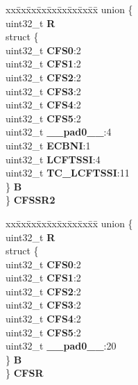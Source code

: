 \begin{DoxyCompactItemize}
\begin{tabbing}
\end{tabbing}\item 
\mbox{\label{structEQADC__tag_a3b79f43167e5031923a7011c88516131}} 
\begin{tabbing}
xx\=xx\=xx\=xx\=xx\=xx\=xx\=xx\=xx\=\kill
union \{\\
\>uint32\_t {\bfseries R}\\
\>struct \{\\
\>\>uint32\_t {\bfseries CFS0}:2\\
\>\>uint32\_t {\bfseries CFS1}:2\\
\>\>uint32\_t {\bfseries CFS2}:2\\
\>\>uint32\_t {\bfseries CFS3}:2\\
\>\>uint32\_t {\bfseries CFS4}:2\\
\>\>uint32\_t {\bfseries CFS5}:2\\
\>\>uint32\_t {\bfseries \_\_pad0\_\_}:4\\
\>\>uint32\_t {\bfseries ECBNI}:1\\
\>\>uint32\_t {\bfseries LCFTSSI}:4\\
\>\>uint32\_t {\bfseries TC\_LCFTSSI}:11\\
\>\} {\bfseries B}\\
\} {\bfseries CFSSR2}\\

\end{tabbing}\item 
\mbox{\label{structEQADC__tag_a1dbfa480c8ddadf34277fa0e7c4dcf3d}} 
\begin{tabbing}
xx\=xx\=xx\=xx\=xx\=xx\=xx\=xx\=xx\=\kill
union \{\\
\>uint32\_t {\bfseries R}\\
\>struct \{\\
\>\>uint32\_t {\bfseries CFS0}:2\\
\>\>uint32\_t {\bfseries CFS1}:2\\
\>\>uint32\_t {\bfseries CFS2}:2\\
\>\>uint32\_t {\bfseries CFS3}:2\\
\>\>uint32\_t {\bfseries CFS4}:2\\
\>\>uint32\_t {\bfseries CFS5}:2\\
\>\>uint32\_t {\bfseries \_\_pad0\_\_}:20\\
\>\} {\bfseries B}\\
\} {\bfseries CFSR}\\


\end{tabbing}
\end{DoxyCompactItemize}
